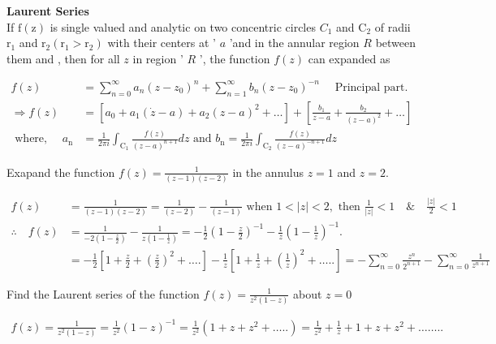 \textbf{Laurent Series}\\
If $\mathrm{f}(\mathrm{z})$ is single valued and analytic on two concentric circles $C_{1}$ and $\mathrm{C}_{2}$ of radii $\mathrm{r}_{1}$ and $\mathrm{r}_{2}\left(\mathrm{r}_{1}>\mathrm{r}_{2}\right)$ with their centers at ' $a$ 'and in the annular region $R$ between them and , then for all $z$ in region ' $R$ ', the function $f(z)$ can expanded as
\begin{answer}
	\begin{align*}
	f(z)&=\sum_{n=0}^{\infty} a_{n}\left(z-z_{0}\right)^{n}+\sum_{n=1}^{\infty} b_{n}\left(z-z_{0}\right)^{-n} \quad \text { Principal part. }\\
	\Rightarrow f(z)&=\left[a_{0}+a_{1}(\dot{z}-a)+a_{2}(z-a)^{2}+\ldots\right]+\left[\frac{b_{1}}{z-a}+\frac{b_{2}}{(z-a)^{2}}+\ldots\right]\\
	\text { where, } \quad a_{\mathrm{n}}&=\frac{1}{2 \pi i} \int_{\mathrm{C}_{1}} \frac{f(z)}{(z-a)^{n+1}} d z \text { and } b_{\mathrm{n}}=\frac{1}{2 \pi i} \int_{\mathrm{C}_{2}} \frac{f(z)}{(z-a)^{-n+1}} d z
	\end{align*}
\end{answer}
\begin{exercise}
	Exapand the function $f(z)=\frac{1}{(z-1)(z-2)}$ in the annulus $z=1$ and $z=2$.
\end{exercise}
\begin{answer}
	\begin{align*}
	f(z)&=\frac{1}{(z-1)(z-2)}=\frac{1}{(z-2)}-\frac{1}{(z-1)} \text { when } 1<|z|<2, \text { then } \frac{1}{|z|}<1 \quad \& \quad \frac{|z|}{2}<1 \\
	\therefore \quad f(z)&=\frac{1}{-2\left(1-\frac{z}{2}\right)}-\frac{1}{z\left(1-\frac{1}{z}\right)}=-\frac{1}{2}\left(1-\frac{z}{2}\right)^{-1}-\frac{1}{z}\left(1-\frac{1}{z}\right)^{-1} . \\
	&=-\frac{1}{2}\left[1+\frac{z}{2}+\left(\frac{z}{2}\right)^{2}+\dots .\right]-\frac{1}{z}\left[1+\frac{1}{z}+\left(\frac{1}{z}\right)^{2}+\ldots . .\right]=-\sum_{n=0}^{\infty} \frac{z^{n}}{2^{n+1}}-\sum_{n=0}^{\infty} \frac{1}{z^{n+1}}
	\end{align*}
\end{answer}
\begin{exercise}
	Find the Laurent series of the function $f(z)=\frac{1}{z^{2}(1-z)}$ about $z=0$
\end{exercise}
\begin{answer}
	\begin{align*}
	f(z)=\frac{1}{z^{2}(1-z)}=\frac{1}{z^{2}}(1-z)^{-1}=\frac{1}{z^{2}}\left(1+z+z^{2}+\ldots . .\right)=\frac{1}{z^{2}}+\frac{1}{z}+1+z+z^{2}+\ldots \ldots . .
	\end{align*}
\end{answer}
